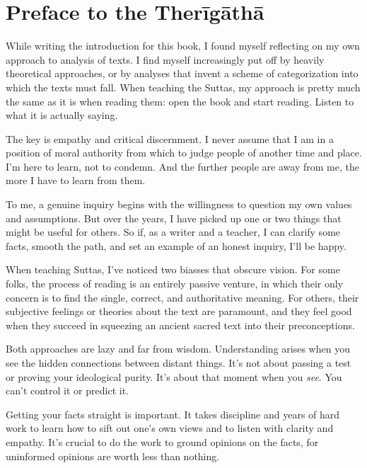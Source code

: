 \documentclass[12pt,openany]{book}%
\begin{document}
%
\chapter*{Preface to the \textsanskrit{Therīgāthā}}

While writing the introduction for this book, I found myself reflecting on my own approach to analysis of texts. I find myself increasingly put off by heavily theoretical approaches, or by analyses that invent a scheme of categorization into which the texts must fall. When teaching the Suttas, my approach is pretty much the same as it is when reading them: open the book and start reading. Listen to what it is actually saying.

The key is empathy and critical discernment. I never assume that I am in a position of moral authority from which to judge people of another time and place. I’m here to learn, not to condemn. And the further people are away from me, the more I have to learn from them.

To me, a genuine inquiry begins with the willingness to question my own values and assumptions. But over the years, I have picked up one or two things that might be useful for others. So if, as a writer and a teacher, I can clarify some facts, smooth the path, and set an example of an honest inquiry, I’ll be happy.

When teaching Suttas, I’ve noticed two biasses that obscure vision. For some folks, the process of reading is an entirely passive venture, in which their only concern is to find the single, correct, and authoritative meaning. For others, their subjective feelings or theories about the text are paramount, and they feel good when they succeed in squeezing an ancient sacred text into their preconceptions. 

Both approaches are lazy and far from wisdom. Understanding arises when you see the hidden connections between distant things. It’s not about passing a test or proving your ideological purity. It’s about that moment when you \emph{see}. You can’t control it or predict it. 

Getting your facts straight is important. It takes discipline and years of hard work to learn how to sift out one’s own views and to listen with clarity and empathy. It’s crucial to do the work to ground opinions on the facts, for uninformed opinions are worth less than nothing. 
\end{document}
